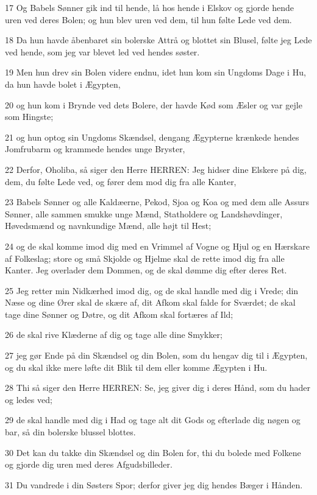 \par 17 Og Babels Sønner gik ind til hende, lå hos hende i Elskov og gjorde hende uren ved deres Bolen; og hun blev uren ved dem, til hun følte Lede ved dem.
\par 18 Da hun havde åbenbaret sin bolerske Attrå og blottet sin Blusel, følte jeg Lede ved hende, som jeg var blevet led ved hendes søster.
\par 19 Men hun drev sin Bolen videre endnu, idet hun kom sin Ungdoms Dage i Hu, da hun havde bolet i Ægypten,
\par 20 og hun kom i Brynde ved dets Bolere, der havde Kød som Æsler og var gejle som Hingste;
\par 21 og hun optog sin Ungdoms Skændsel, dengang Ægypterne krænkede hendes Jomfrubarm og krammede hendes unge Bryster,
\par 22 Derfor, Oholiba, så siger den Herre HERREN: Jeg hidser dine Elskere på dig, dem, du følte Lede ved, og fører dem mod dig fra alle Kanter,
\par 23 Babels Sønner og alle Kaldæerne, Pekod, Sjoa og Koa og med dem alle Assurs Sønner, alle sammen smukke unge Mænd, Statholdere og Landshøvdinger, Høvedsmænd og navnkundige Mænd, alle højt til Hest;
\par 24 og de skal komme imod dig med en Vrimmel af Vogne og Hjul og en Hærskare af Folkeslag; store og små Skjolde og Hjelme skal de rette imod dig fra alle Kanter. Jeg overlader dem Dommen, og de skal dømme dig efter deres Ret.
\par 25 Jeg retter min Nidkærhed imod dig, og de skal handle med dig i Vrede; din Næse og dine Ører skal de skære af, dit Afkom skal falde for Sværdet; de skal tage dine Sønner og Døtre, og dit Afkom skal fortæres af Ild;
\par 26 de skal rive Klæderne af dig og tage alle dine Smykker;
\par 27 jeg gør Ende på din Skændsel og din Bolen, som du hengav dig til i Ægypten, og du skal ikke mere løfte dit Blik til dem eller komme Ægypten i Hu.
\par 28 Thi så siger den Herre HERREN: Se, jeg giver dig i deres Hånd, som du hader og ledes ved;
\par 29 de skal handle med dig i Had og tage alt dit Gods og efterlade dig nøgen og bar, så din bolerske blussel blottes.
\par 30 Det kan du takke din Skændsel og din Bolen for, thi du bolede med Folkene og gjorde dig uren med deres Afgudsbilleder.
\par 31 Du vandrede i din Søsters Spor; derfor giver jeg dig hendes Bæger i Hånden.
